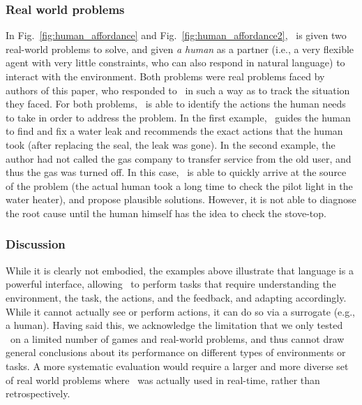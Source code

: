 \subsubsection{Real world problems}   
In Fig.~\ref{fig:human_affordance} and Fig.~\ref{fig:human_affordance2}, \DV\ is given two real-world problems to solve, and given \emph{a human} as a partner (i.e., a very flexible agent with very little constraints, who can also respond in natural language) to interact with the environment.
Both problems were real problems faced by authors of this paper, who responded to \DV\ in such a way as to track the situation they faced. For both problems, \DV\ is able to identify the actions the human needs to take in order to address the problem. In the first example, \DV\ guides the human to find and fix a water leak and recommends the exact actions that the human took (after replacing the seal, the leak was gone).
In the second example, the author had not called the gas company to transfer service from the old user, and thus the gas was turned off.
In this case, \DV\ is able to quickly arrive at the source of the problem (the actual human took a long time to check the pilot light in the water heater), and propose plausible solutions. However, it is not able to diagnose the root cause until the human himself has the idea to check the stove-top.

\subsubsection{Discussion}
While it is clearly not embodied, the examples above illustrate that language is a powerful interface, allowing \DV\ to perform tasks that require understanding the environment, the task, the actions, and the feedback, and adapting accordingly.
While it cannot actually see or perform actions, it can do so via a surrogate (e.g., a human).
Having said this, we acknowledge the limitation that we only tested \DV\ on a limited number of games and real-world problems, and thus cannot draw general conclusions about its performance on different types of environments or tasks. A more systematic evaluation would require a larger and more diverse set of real world problems where \DV\ was actually used in real-time, rather than retrospectively.


